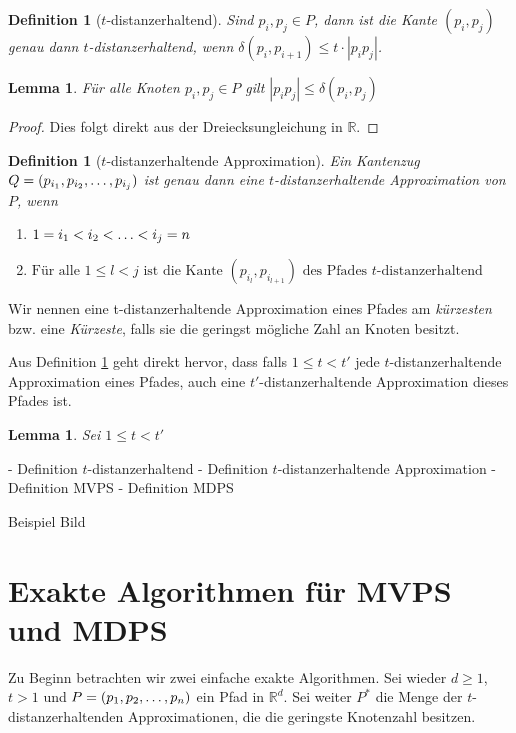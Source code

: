 \documentclass[11pt]{article}
\newcommand{\R}{\mathbb{R}}
\newcommand{\n}{\newline}
\newtheorem{lemma}[theorem]{Lemma}
\newtheorem{definition}[theorem]{Definition}
\begin{document}
	\begin{definition}[$t$-distanzerhaltend]
		\label{def:t-dist}
		Sind $p_i, p_j \in P$, dann ist die Kante $(p_i, p_j)$ genau dann \emph{$t$-distanzerhaltend}, wenn $\delta(p_i, p_{i+1}) \leq t \cdot |p_ip_j|$.
	\end{definition}
	\begin{lemma}
		\label{lem:triangle}
		Für alle Knoten $p_i, p_j \in P$ gilt $|p_ip_j| \leq \delta(p_i, p_j)$
	\end{lemma}
	\begin{proof}
		Dies folgt direkt aus der Dreiecksungleichung in $\R$.
	\end{proof}
	\begin{definition}[$t$-distanzerhaltende Approximation]
		\label{def:t-distapp}
		Ein Kantenzug $Q = (p_{i_1}, p_{i_2}, \mathellipsis, p_{i_j})$ ist genau dann eine \emph{$t$-distanzerhaltende Approximation von $P$}, wenn
		\begin{enumerate}
			\item $\displaystyle 1 = i_1 < i_2 < \mathellipsis < i_j = n$
			\item $\displaystyle \text{Für alle } 1 \leq l < j \text{ ist die Kante } (p_{i_l}, p_{i_{l+1}}) \text{ des Pfades $t$-distanzerhaltend}$
		\end{enumerate}
	\end{definition}
	
	Wir nennen eine t-distanzerhaltende Approximation eines Pfades am \emph{kürzesten} bzw. eine \emph{Kürzeste}, falls sie die geringst mögliche Zahl an Knoten besitzt.
	
	Aus Definition \ref{def:t-distapp} geht direkt hervor, dass falls $1 \leq t < t'$ jede $t$-distanzerhaltende Approximation eines Pfades, auch eine $t'$-distanzerhaltende Approximation dieses Pfades ist. 

	\begin{lemma}
		\label{lem:approximations}
		Sei $1 \leq t < t'$
	\end{lemma}
    - Definition $t$-distanzerhaltend\n
    - Definition $t$-distanzerhaltende Approximation\n
    - Definition MVPS\n
    - Definition MDPS\n

    Beispiel Bild

    \section{Exakte Algorithmen für MVPS und MDPS}
    \label{sec:exact}
    
    Zu Beginn betrachten wir zwei einfache exakte Algorithmen.
    Sei wieder $d\geq1$, $t>1$ und $P = (p_1, p_2, \mathellipsis, p_n)$ ein Pfad in $\R^d$. Sei weiter $P^*$ die Menge der $t$-distanzerhaltenden Approximationen, die die geringste Knotenzahl besitzen.
    
\end{document}
